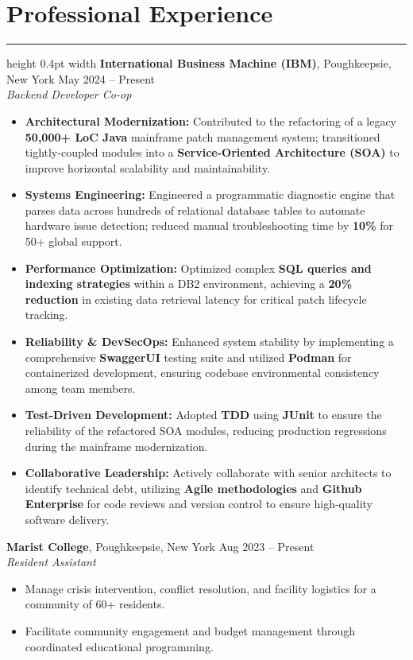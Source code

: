 \documentclass[letterpaper,9pt]{article}
\begin{document}
\section*{Professional Experience}
\hrule height 0.4pt width \textwidth \vspace{2pt}
\textbf{International Business Machine (IBM)}, Poughkeepsie, New York \hfill May 2024 -- Present \\
\textit{Backend Developer Co-op}
\begin{itemize}[leftmargin=*, noitemsep, topsep=2pt, parsep=0pt]
    \item \textbf{Architectural Modernization:} Contributed to the refactoring of a legacy \textbf{50,000+ LoC Java} mainframe patch management system; transitioned tightly-coupled modules into a \textbf{Service-Oriented Architecture (SOA)} to improve horizontal scalability and maintainability.
    \item \textbf{Systems Engineering:} Engineered a programmatic diagnostic engine that parses data across hundreds of relational database tables to automate hardware issue detection; reduced manual troubleshooting time by \textbf{10\%} for 50+ global support.
    \item \textbf{Performance Optimization:} Optimized complex \textbf{SQL queries and indexing strategies} within a DB2 environment, achieving a \textbf{20\% reduction} in existing data retrieval latency for critical patch lifecycle tracking.
    \item \textbf{Reliability \& DevSecOps:} Enhanced system stability by implementing a comprehensive \textbf{SwaggerUI} testing suite and utilized \textbf{Podman} for containerized development, ensuring codebase environmental consistency among team members.
    \item \textbf{Test-Driven Development:} Adopted \textbf{TDD} using \textbf{JUnit} to ensure the reliability of the refactored SOA modules, reducing production regressions during the mainframe modernization.
    \item \textbf{Collaborative Leadership:} Actively collaborate with senior architects to identify technical debt, utilizing \textbf{Agile methodologies} and \textbf{Github Enterprise} for code reviews and version control to ensure high-quality software delivery.
\end{itemize}

\vspace{2pt}
\textbf{Marist College}, Poughkeepsie, New York \hfill Aug 2023 -- Present \\
\textit{Resident Assistant}
\begin{itemize}[leftmargin=*, noitemsep, topsep=2pt, parsep=0pt]
    \item Manage crisis intervention, conflict resolution, and facility logistics for a community of 60+ residents.
    \item Facilitate community engagement and budget management through coordinated educational programming.
\end{itemize}
\end{document}
